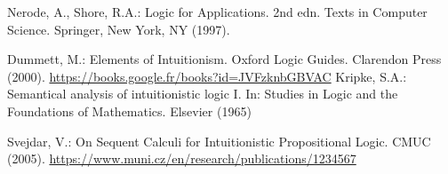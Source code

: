 \documentclass[runningheads]{llncs}
\begin{document}
\begin{thebibliography}{8}

    Nerode, A., Shore, R.A.: Logic for Applications. 2nd edn. Texts in Computer Science. Springer, New York, NY (1997). 
    
    Dummett, M.: Elements of Intuitionism. Oxford Logic Guides. Clarendon Press (2000). \url{https://books.google.fr/books?id=JVFzknbGBVAC}
    Kripke, S.A.: Semantical analysis of intuitionistic logic I. In: Studies in Logic and the Foundations of Mathematics. Elsevier (1965)


    Svejdar, V.: On Sequent Calculi for Intuitionistic Propositional Logic. CMUC (2005). \url{https://www.muni.cz/en/research/publications/1234567}


\end{thebibliography}
\end{document}
